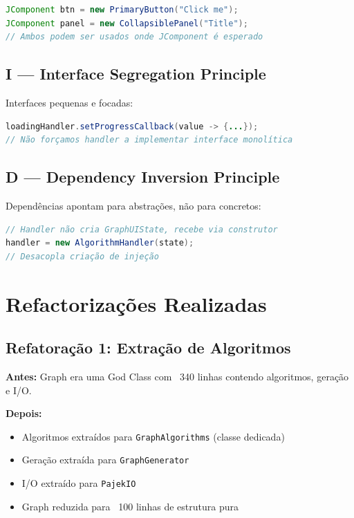 \documentclass[12pt,a4paper]{article}
\begin{document}
\begin{lstlisting}[language=Java, caption=LSP em Componentes Customizados]
JComponent btn = new PrimaryButton("Click me");
JComponent panel = new CollapsiblePanel("Title");
// Ambos podem ser usados onde JComponent é esperado
\end{lstlisting}

\subsection{I — Interface Segregation Principle}

Interfaces pequenas e focadas:

\begin{lstlisting}[language=Java, caption=ISP em Listeners]
loadingHandler.setProgressCallback(value -> {...});
// Não forçamos handler a implementar interface monolítica
\end{lstlisting}

\subsection{D — Dependency Inversion Principle}

Dependências apontam para abstrações, não para concretos:

\begin{lstlisting}[language=Java, caption=DIP em Handlers]
// Handler não cria GraphUIState, recebe via construtor
handler = new AlgorithmHandler(state);
// Desacopla criação de injeção
\end{lstlisting}

\newpage

\section{Refactorizações Realizadas}

\subsection{Refatoração 1: Extração de Algoritmos}

\textbf{Antes:} Graph era uma God Class com ~340 linhas contendo algoritmos, geração e I/O.

\textbf{Depois:}
\begin{itemize}
    \item Algoritmos extraídos para \texttt{GraphAlgorithms} (classe dedicada)
    \item Geração extraída para \texttt{GraphGenerator}
    \item I/O extraído para \texttt{PajekIO}
    \item Graph reduzida para ~100 linhas de estrutura pura
\end{itemize}
\end{document}
